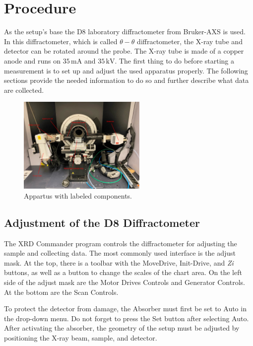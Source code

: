 \section{Procedure}

As the setup's base the D8 laboratory diffractometer from Bruker-AXS is used.
In this diffractometer, which is called $\theta - \theta$ diffractometer, the X-ray tube and detector can be rotated around the probe.
The X-ray tube is made of a copper anode and runs on $35\, \unit{\milli \ampere}$ and $35\, \unit{\kilo \volt}$.
The first thing to do before starting a measurement is to set up and adjust the used apparatus properly. 
The following sections provide the needed information to do so and further describe what data are collected.

\begin{figure}
	\centering
	\includegraphics[width=0.55\textwidth]{content/graphics/apparatus.pdf}
	\caption{Appartus with labeled components.}
	\label{fig:Apparatus}
\end{figure}


\subsection{Adjustment of the D8 Diffractometer}
The XRD Commander program controls the diffractometer for adjusting the sample and collecting data. The most commonly used interface is the adjust mask. At the top, there is a toolbar with the MoveDrive, Init-Drive, and \textit{Zi} buttons, as well as a button to change the scales of the chart area. On the left side of the adjust mask are the Motor Drives Controls and Generator Controls. At the bottom are the Scan Controls.

To protect the detector from damage, the Absorber must first be set to Auto in the drop-down menu. Do not forget to press the Set button after selecting Auto. After activating the absorber, the geometry of the setup must be adjusted by positioning the X-ray beam, sample, and detector.


